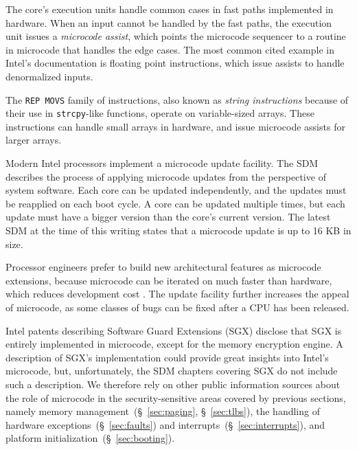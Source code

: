 
The core's execution units handle common cases in fast paths implemented in
hardware. When an input cannot be handled by the fast paths, the execution
unit issues a \textit{microcode assist}, which points the microcode sequencer
to a routine in microcode that handles the edge cases. The most common cited
example in Intel's documentation is floating point instructions, which issue
assists to handle denormalized inputs.

The \texttt{REP MOVS} family of instructions, also known as \textit{string
instructions} because of their use in \texttt{strcpy}-like functions, operate
on variable-sized arrays. These instructions can handle small arrays in
hardware, and issue microcode assists for larger arrays.


Modern Intel processors implement a microcode update facility. The SDM
describes the process of applying microcode updates from the perspective of
system software. Each core can be updated independently, and the updates must
be reapplied on each boot cycle. A core can be updated multiple times, but each
update must have a bigger version than the core's current version. The latest
SDM at the time of this writing states that a microcode update is up to 16 KB
in size.

Processor engineers prefer to build new architectural features as microcode
extensions, because microcode can be iterated on much faster than hardware,
which reduces development cost \cite{intel2008genetic, intel2012clusters}. The
update facility further increases the appeal of microcode, as some classes of
bugs can be fixed after a CPU has been released.

Intel patents \cite{intel2013patent1, intel2013patent2} describing Software
Guard Extensions (SGX) disclose that SGX is entirely implemented in microcode,
except for the memory encryption engine. A description of SGX's implementation
could provide great insights into Intel's microcode, but, unfortunately, the
SDM chapters covering SGX do not include such a description. We therefore rely
on other public information sources about the role of microcode in the
security-sensitive areas covered by previous sections, namely memory
management~(\S~\ref{sec:paging}, \S~\ref{sec:tlbs}), the handling of hardware
exceptions~(\S~\ref{sec:faults}) and interrupts~(\S~\ref{sec:interrupts}), and
platform initialization~(\S~\ref{sec:booting}).

